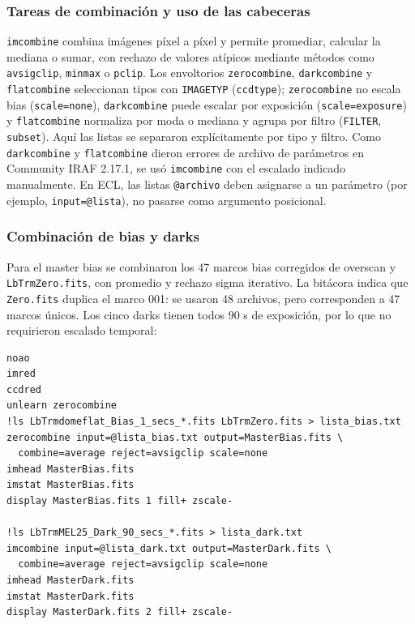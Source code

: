\documentclass[10pt,a4paper,twocolumn]{article}
\begin{document}
\subsubsection{Tareas de combinación y uso de las cabeceras}

{\raggedright
\texttt{imcombine} combina imágenes píxel a píxel y permite promediar,
calcular la mediana o sumar, con rechazo de valores atípicos mediante métodos
como \texttt{avsigclip}, \texttt{minmax} o \texttt{pclip}. Los envoltorios
\texttt{zerocombine}, \texttt{darkcombine} y \texttt{flatcombine}
seleccionan tipos con \texttt{IMAGETYP} (\texttt{ccdtype});
\texttt{zerocombine} no escala bias (\texttt{scale=none}),
\texttt{darkcombine} puede escalar por exposición
(\texttt{scale=exposure}) y \texttt{flatcombine} normaliza por moda o
mediana y agrupa por filtro (\texttt{FILTER}, \texttt{subset}).
Aquí las listas se separaron explícitamente por tipo y filtro. Como
\texttt{darkcombine} y \texttt{flatcombine} dieron errores de archivo de
parámetros en Community IRAF 2.17.1, se usó \texttt{imcombine} con el
escalado indicado manualmente. En ECL, las listas \texttt{@archivo}
deben asignarse a un parámetro (por ejemplo, \texttt{input=@lista}), no
pasarse como argumento posicional.
\par}

\subsubsection{Combinación de bias y darks}

Para el master bias se combinaron los 47 marcos bias corregidos de overscan y
\texttt{LbTrmZero.fits}, con promedio y rechazo sigma iterativo. La bitácora
indica que \texttt{Zero.fits} duplica el marco 001: se usaron 48 archivos,
pero corresponden a 47 marcos únicos. Los cinco darks tienen todos 90 s de
exposición, por lo que no requirieron escalado temporal:

\begin{lstlisting}
noao
imred
ccdred
unlearn zerocombine
!ls LbTrmdomeflat_Bias_1_secs_*.fits LbTrmZero.fits > lista_bias.txt
zerocombine input=@lista_bias.txt output=MasterBias.fits \
  combine=average reject=avsigclip scale=none
imhead MasterBias.fits
imstat MasterBias.fits
display MasterBias.fits 1 fill+ zscale-

!ls LbTrmMEL25_Dark_90_secs_*.fits > lista_dark.txt
imcombine input=@lista_dark.txt output=MasterDark.fits \
  combine=average reject=avsigclip scale=none
imhead MasterDark.fits
imstat MasterDark.fits
display MasterDark.fits 2 fill+ zscale-
\end{lstlisting}
\end{document}
